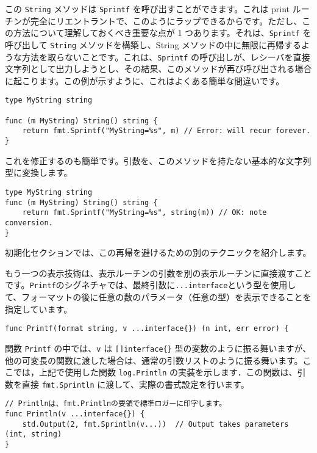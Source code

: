 \documentclass{jsarticle}
\begin{document}
この \texttt{String} メソッドは \texttt{Sprintf}
を呼び出すことができます。これは print
ルーチンが完全にリエントラントで、このようにラップできるからです。ただし、この方法について理解しておくべき重要な点が
1 つあります。それは、\texttt{Sprintf} を呼び出して \texttt{String}
メソッドを構築し、String
メソッドの中に無限に再帰するような方法を取らないことです。これは、\texttt{Sprintf}
の呼び出しが、レシーバを直接文字列として出力しようとし、その結果、このメソッドが再び呼び出される場合に起こります。この例が示すように、これはよくある簡単な間違いです。

\begin{lstlisting}[numbers=none]
type MyString string

func (m MyString) String() string {
    return fmt.Sprintf("MyString=%s", m) // Error: will recur forever.
}
\end{lstlisting}

これを修正するのも簡単です。引数を、このメソッドを持たない基本的な文字列型に変換します。

\begin{lstlisting}[numbers=none]
type MyString string
func (m MyString) String() string {
    return fmt.Sprintf("MyString=%s", string(m)) // OK: note conversion.
}
\end{lstlisting}

{初期化セクション}では、この再帰を避けるための別のテクニックを紹介します。

もう一つの表示技術は、表示ルーチンの引数を別の表示ルーチンに直接渡すことです。\texttt{Printf}のシグネチャでは、最終引数に\texttt{...interface}という型を使用して、フォーマットの後に任意の数のパラメータ（任意の型）を表示できることを指定しています。

\begin{lstlisting}[numbers=none]
func Printf(format string, v ...interface{}) (n int, err error) {
\end{lstlisting}

関数 \texttt{Printf} の中では、\texttt{v} は
\texttt{{[}{]}interface\{\}}
型の変数のように振る舞いますが、他の可変長の関数に渡した場合は、通常の引数リストのように振る舞います。ここでは，上記で使用した関数
\texttt{log.Println} の実装を示します．この関数は、引数を直接
\texttt{fmt.Sprintln} に渡して、実際の書式設定を行います。

\begin{lstlisting}[numbers=none]
// Printlnは、fmt.Printlnの要領で標準ロガーに印字します。
func Println(v ...interface{}) {
    std.Output(2, fmt.Sprintln(v...))  // Output takes parameters (int, string)
}
\end{lstlisting}
\end{document}
